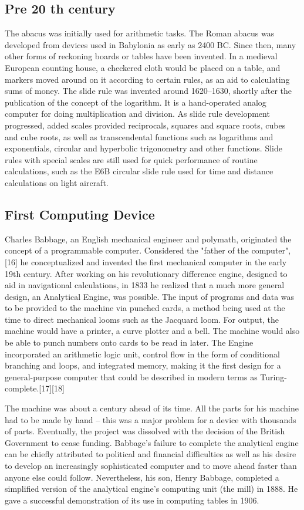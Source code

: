 \documentclass[a4paper,11pt]{article}
\begin{document}
\subsection{Pre 20 th century}
The abacus was initially used for arithmetic tasks. The Roman abacus was developed from devices used in Babylonia as early as 2400 BC. Since then, many other forms of reckoning boards or tables have been invented. In a medieval European counting house, a checkered cloth would be placed on a table, and markers moved around on it according to certain rules, as an aid to calculating sums of money. 
The slide rule was invented around 1620–1630, shortly after the publication of the concept of the logarithm. It is a hand-operated analog computer for doing multiplication and division. As slide rule development progressed, added scales provided reciprocals, squares and square roots, cubes and cube roots, as well as transcendental functions such as logarithms and exponentials, circular and hyperbolic trigonometry and other functions. Slide rules with special scales are still used for quick performance of routine calculations, such as the E6B circular slide rule used for time and distance calculations on light aircraft. 
\subsection{First Computing Device}
Charles Babbage, an English mechanical engineer and polymath, originated the concept of a programmable computer. Considered the "father of the computer",[16] he conceptualized and invented the first mechanical computer in the early 19th century. After working on his revolutionary difference engine, designed to aid in navigational calculations, in 1833 he realized that a much more general design, an Analytical Engine, was possible. The input of programs and data was to be provided to the machine via punched cards, a method being used at the time to direct mechanical looms such as the Jacquard loom. For output, the machine would have a printer, a curve plotter and a bell. The machine would also be able to punch numbers onto cards to be read in later. The Engine incorporated an arithmetic logic unit, control flow in the form of conditional branching and loops, and integrated memory, making it the first design for a general-purpose computer that could be described in modern terms as Turing-complete.[17][18]

The machine was about a century ahead of its time. All the parts for his machine had to be made by hand – this was a major problem for a device with thousands of parts. Eventually, the project was dissolved with the decision of the British Government to cease funding. Babbage's failure to complete the analytical engine can be chiefly attributed to political and financial difficulties as well as his desire to develop an increasingly sophisticated computer and to move ahead faster than anyone else could follow. Nevertheless, his son, Henry Babbage, completed a simplified version of the analytical engine's computing unit (the mill) in 1888. He gave a successful demonstration of its use in computing tables in 1906. 
\end{document}
